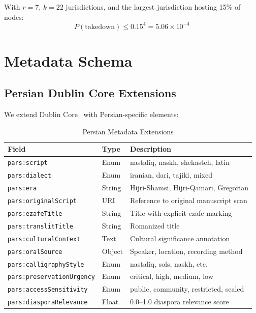 \documentclass[11pt,a4paper]{article}
\begin{document}
With $r = 7$, $k = 22$ jurisdictions, and the largest jurisdiction hosting 15\% of nodes:
\begin{equation}
    P(\text{takedown}) \leq 0.15^4 = 5.06 \times 10^{-4}
\end{equation}

\section{Metadata Schema}
\label{sec:metadata}

\subsection{Persian Dublin Core Extensions}

We extend Dublin Core~\citep{dcmi2020terms} with Persian-specific elements:

\begin{table}[H]
\centering
\caption{Persian Metadata Extensions}
\label{tab:metadata}
\begin{tabular}{lll}
\toprule
\textbf{Field} & \textbf{Type} & \textbf{Description} \\
\midrule
\texttt{pars:script} & Enum & nastaliq, naskh, shekasteh, latin \\
\texttt{pars:dialect} & Enum & iranian, dari, tajiki, mixed \\
\texttt{pars:era} & String & Hijri-Shamsi, Hijri-Qamari, Gregorian \\
\texttt{pars:originalScript} & URI & Reference to original manuscript scan \\
\texttt{pars:ezafeTitle} & String & Title with explicit ezafe marking \\
\texttt{pars:translitTitle} & String & Romanized title \\
\texttt{pars:culturalContext} & Text & Cultural significance annotation \\
\texttt{pars:oralSource} & Object & Speaker, location, recording method \\
\texttt{pars:calligraphyStyle} & Enum & nastaliq, sols, naskh, etc. \\
\texttt{pars:preservationUrgency} & Enum & critical, high, medium, low \\
\texttt{pars:accessSensitivity} & Enum & public, community, restricted, sealed \\
\texttt{pars:diasporaRelevance} & Float & 0.0--1.0 diaspora relevance score \\
\bottomrule
\end{tabular}
\end{table}
\end{document}
